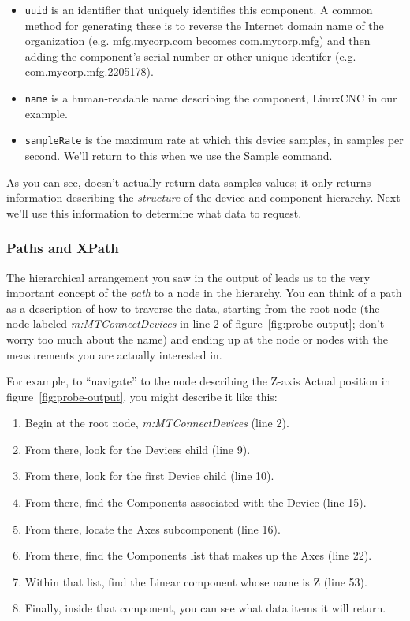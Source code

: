 \begin{itemize}
\item \verb+uuid+ is an identifier that uniquely identifies this
  component.  A common method for generating these is to reverse the
  Internet domain name of the organization (e.g. mfg.mycorp.com becomes
  com.mycorp.mfg) and then adding the component's serial number or other
  unique identifer (e.g. com.mycorp.mfg.2205178).
\item \verb+name+ is a human-readable name describing the component,
  LinuxCNC in our example.
\item \verb+sampleRate+ is the maximum rate at which this device
  samples, in samples per second.  We'll return to this when we use the
  Sample command.
\end{itemize}

As you can see,  doesn't actually return data samples
values; it only returns information describing the \emph{structure} of
the device and component hierarchy.  Next we'll use this information to
determine what data to request.

\subsubsection{Paths and XPath}
\label{sec:xpath}

The hierarchical arrangement you saw in the output of 
leads us to the very important concept of 
the \emph{path} to a node in the hierarchy.  You can think of a path as
a description of how to traverse the data, starting from the root node
(the node labeled \emph{m:MTConnectDevices} in line 2 of
figure~\ref{fig:probe-output}; don't worry too much about the name) and
ending up at the node or nodes with the measurements you are actually
interested in.

For example, to ``navigate'' to the node describing the Z-axis Actual
position in figure~\ref{fig:probe-output}, you might describe it like
this:

\begin{enumerate}
\item Begin at the root node, \emph{m:MTConnectDevices} (line 2).
\item From there, look for the Devices child (line 9).
\item From there, look for the first Device child (line 10).
\item From there, find the Components associated with the Device (line
  15).
\item From there, locate the Axes subcomponent (line 16).
\item From there, find the Components list that makes up the Axes (line
  22).
\item Within that list, find the Linear component whose name is Z (line 53).
\item Finally, inside that component, you can see what data items it
  will return.
\end{enumerate}

